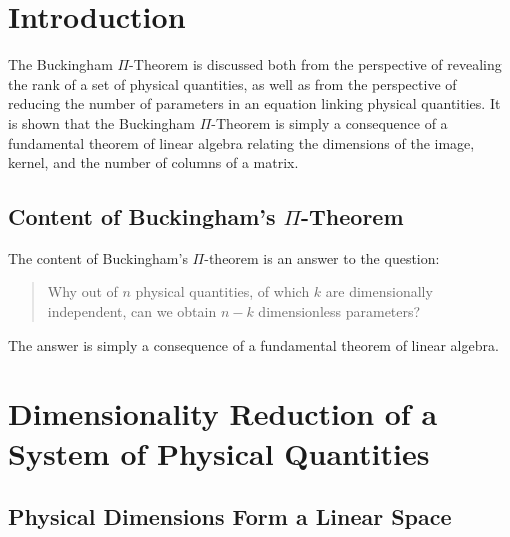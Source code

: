 

\section{Introduction}
 
The Buckingham $\Pi$-Theorem is discussed both from the perspective of revealing the rank of a set of physical quantities, as well as from the perspective of reducing the number of parameters in an equation linking physical quantities. It is shown that the Buckingham $\Pi$-Theorem is simply a consequence of a fundamental theorem of linear algebra relating the dimensions of the image, kernel, and the number of columns of a matrix.   
% 
% 
% 
% 

\subsection{Content of Buckingham's $\Pi$-Theorem}

The content of Buckingham's $\Pi$-theorem is an answer to the question:
\begin{quote}
Why out of $n$ physical quantities, of which $k$ are dimensionally independent, can we obtain $n-k$ dimensionless parameters?
\end{quote}
 
The answer is simply a consequence of a fundamental theorem of linear algebra. \cite{zorich, sonin, bluman_kumei, olsen}

\section{Dimensionality Reduction of a System of Physical Quantities}

\subsection{Physical Dimensions Form a Linear Space}

